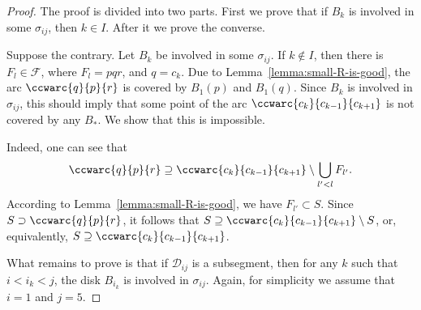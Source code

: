 \begin{appendices}
\begin{proof}
The proof is divided into two parts. First we prove that if $B_k$ is involved in some $\sigma_{ij}$, then $k\in I$. After it we prove the converse.

Suppose the contrary. Let $B_k$ be involved in some $\sigma_{ij}$. If $k\notin I$, then there is $F_l\in\mathcal{F}$, where $F_l = pqr$, and $q = c_k$. Due to Lemma~\ref{lemma:small-R-is-good}, the arc $\ccwarc{q}{p}{r}$ is covered by $B_1(p)$ and $B_1(q)$. Since $B_k$ is involved in $\sigma_{ij}$, this should imply that some point of the arc $\ccwarc{c_k}{c_{k-1}}{c_{k+1}}$ is not covered by any $B_*$. We show that this is impossible.

Indeed, one can see that
$$\ccwarc{q}{p}{r}\supseteq\ccwarc{c_k}{c_{k-1}}{c_{k+1}}\setminus\bigcup_{l' < l}F_{l'}.$$
According to Lemma~\ref{lemma:small-R-is-good}, we have $F_{l'}\subset S$. Since $S\supset\ccwarc{q}{p}{r}$, it follows that $S\supseteq\ccwarc{c_k}{c_{k-1}}{c_{k+1}}\setminus S$, or, equivalently, $S\supseteq\ccwarc{c_k}{c_{k-1}}{c_{k+1}}$.



\medskip
What remains to prove is that if $\mathcal{D}_{ij}$ is a subsegment, then for any
$k$ such that $i < i_k < j$, the disk $B_{i_k}$ is involved in $\sigma_{ij}$. Again, for simplicity we assume that $i = 1$ and $j = 5$.


\end{proof}
\end{appendices}
